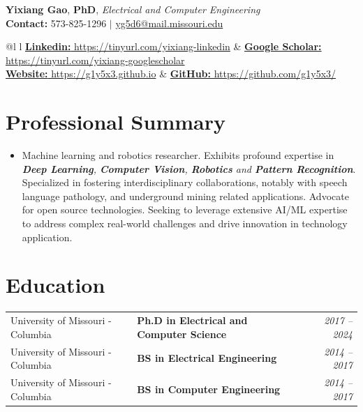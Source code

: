 \documentclass[letterpaper,10pt]{article}
\begin{document}
\begin{flushleft}
  \textbf{\large Yixiang Gao},
  \textbf{\large PhD}, 
  \textit{\large Electrical and Computer Engineering}\\
  \vspace{2.5pt}
  \textbf{Contact:} 573-825-1296 $|$
  \href{mailto:yg5d6@umsystem.edu}{yg5d6@mail.missouri.edu}\\
\end{flushleft}

\begin{tabular*}{\textwidth}{@{\extracolsep{\fill}}l l}
  \href{https://www.linkedin.com/in/yixiang-gao-13a1408b/}
  {{\textbf{Linkedin:} https://tinyurl.com/yixiang-linkedin}} & 
  \href{https://scholar.google.com/citations?user=7104qXwAAAAJ&hl=en}
  {{\textbf{Google Scholar:} https://tinyurl.com/yixiang-googlescholar}}\\
  
  \href{https://g1y5x3.github.io}{{\textbf{Website:} https://g1y5x3.github.io}} &
  \href{https://github.com/g1y5x3/}{{\textbf{GitHub:} https://github.com/g1y5x3/}}
\end{tabular*} 

\section{Professional Summary}
\begin{itemize}[leftmargin=0.15in, label={}]
  \item{
    Machine learning and robotics researcher.
    Exhibits profound expertise in \textit{\textbf{Deep Learning}, \textbf{Computer Vision}, \textbf{Robotics} and \textbf{Pattern Recognition}}.
    Specialized in fostering interdisciplinary collaborations, notably with speech language pathology, and underground mining related applications. 
    Advocate for open source technologies.
    Seeking to leverage extensive AI/ML expertise to address complex real-world challenges and drive innovation in technology application.
  }
\end{itemize}

\section{Education}
\begin{tabular*}{\textwidth}{@{\extracolsep{\fill}}l l r}
  University of Missouri - Columbia & 
  \textbf{Ph.D in Electrical and Computer Science} &
  \textit{2017 -- 2024} \\
  
  University of Missouri - Columbia &
  \textbf{BS in Electrical Engineering} &
  \textit{2014 -- 2017} \\
  
  University of Missouri - Columbia &
  \textbf{BS in Computer Engineering} &
  \textit{2014 -- 2017} \\
\end{tabular*}
\end{document}
